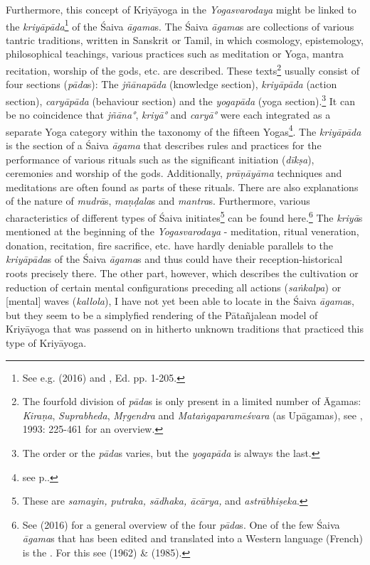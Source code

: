Furthermore, this concept of Kriyāyoga in the \textit{Yogasvarodaya} might be linked to the \textit{kriyāpāda}\footnote{See e.g. \citeauthor{ganesan2016saiva} (2016) and , Ed. pp. 1-205.} of the Śaiva \textit{āgama}s. The Śaiva \textit{āgama}s are collections of various tantric traditions, written in Sanskrit or Tamil, in which cosmology, epistemology, philosophical teachings, various practices such as meditation or Yoga, mantra recitation, worship of the gods, etc. are described. These texts\footnote{The fourfold division of \textit{pāda}s is only present in a limited number of Āgamas: \textit{Kiraṇa}, \textit{Suprabheda}, \textit{Mṛgendra} and \textit{Mataṅgaparameśvara} (as Upāgamas), see \citeauthor{brunner1994place} , 1993: 225-461 for an overview.} usually consist of four sections (\textit{pāda}s): The \textit{jñānapāda} (knowledge section), \textit{kriyāpāda} (action section), \textit{caryāpāda} (behaviour section) and the \textit{yogapāda} (yoga section).\footnote{The order or the \textit{pāda}s varies, but the \textit{yogapāda} is always the last.} It can be no coincidence that \textit{jñāna°}, \textit{kriyā°} and \textit{caryā°} were each integrated as a separate Yoga category within the taxonomy of the fifteen Yogas\footnote{see p.\pageref{intro}.}. The \textit{kriyāpāda} is the section of a Śaiva \textit{āgama} that describes rules and practices for the performance of various rituals such as the significant initiation (\textit{dīkṣa}), ceremonies and worship of the gods. Additionally, \textit{prāṇāyāma} techniques and meditations are often found as parts of these rituals. There are also explanations of the nature of \textit{mudrā}s, \textit{maṇḍala}s and \textit{mantra}s. Furthermore, various characteristics of different types of Śaiva initiates\footnote{These are \textit{samayin, putraka, sādhaka, ācārya,} and \textit{astrābhiṣeka}.} can be found here.\footnote{See \citeauthor{ganesan2016saiva} (2016) for a general overview of the four \textit{pāda}s. One of the few Śaiva \textit{āgama}s that has been edited and translated into a Western language (French) is the . For this see \citeauthor{mrgendragama} (1962) \& \citeauthor{mrgendragamabrunner} (1985).} The \textit{kriyā}s mentioned at the beginning of the \textit{Yogasvarodaya} - meditation, ritual veneration, donation, recitation, fire sacrifice, etc. have hardly deniable parallels to the \textit{kriyāpāda}s of the Śaiva \textit{āgama}s and thus could have their reception-historical roots precisely there. The other part, however, which describes the cultivation or reduction of certain mental configurations preceding all actions (\textit{saṅkalpa}) or [mental] waves (\textit{kallola}), I have not yet been able to locate in the Śaiva \textit{āgama}s, but they seem to be a simplyfied rendering of the Pātañjalean model of Kriyāyoga that was passend on in hitherto unknown traditions that practiced this type of Kriyāyoga.

